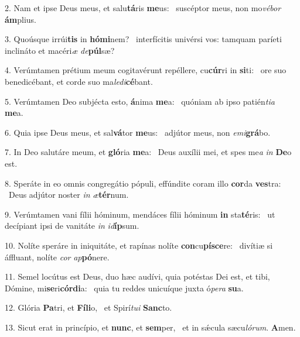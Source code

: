 2. Nam et ipse Deus meus, et salu\textbf{tá}ris \textbf{me}us: \ast\  suscéptor meus, non mo\textit{vé}\textit{bor} \textbf{ám}plius.\

3. Quoúsque irrúi\textbf{tis} in \textbf{hó}\textbf{mi}nem? \ast\  interfícitis univérsi vos: tamquam paríeti inclináto et macéri\textit{æ} \textit{de}\textbf{púl}sæ?\

4. Verúmtamen prétium meum cogitavérunt repéllere, cu\textbf{cúr}ri in \textbf{si}ti: \ast\  ore suo benedicébant, et corde suo ma\textit{le}\textit{di}\textbf{cé}bant.\

5. Verúmtamen Deo subjécta esto, \textbf{á}nima \textbf{me}a: \ast\  quóniam ab ipso patién\textit{ti}\textit{a} \textbf{me}a.\

6. Quia ipse Deus meus, et sal\textbf{vá}tor \textbf{me}us: \ast\  adjútor meus, non \textit{e}\textit{mi}\textbf{grá}bo.\

7. In Deo salutáre meum, et \textbf{gló}ria \textbf{me}a: \ast\  Deus auxílii mei, et spes me\textit{a} \textit{in} \textbf{De}o est.\

8. Speráte in eo omnis congregátio pópuli, effúndite coram illo \textbf{cor}da \textbf{ves}tra: \ast\  Deus adjútor noster \textit{in} \textit{æ}\textbf{tér}num.\

9. Verúmtamen vani fílii hóminum, mendáces fílii hóminum \textbf{in} sta\textbf{té}ris: \ast\  ut decípiant ipsi de vanitáte \textit{in} \textit{id}\textbf{íp}sum.\

10. Nolíte speráre in iniquitáte, et rapínas nolíte \textbf{con}cu\textbf{pí}\textbf{sce}re: \ast\  divítiæ si áffluant, nolíte \textit{cor} \textit{ap}\textbf{pó}nere.\

11. Semel locútus est Deus, duo hæc audívi, quia potéstas Dei est, et tibi, Dómine, mi\textbf{se}ri\textbf{cór}\textbf{di}a: \ast\  quia tu reddes unicuíque juxta ó\textit{pe}\textit{ra} \textbf{su}a.\

12. Glória \textbf{Pa}tri, et \textbf{Fí}\textbf{li}o, \ast\  et Spirí\textit{tu}\textit{i} \textbf{Sanc}to.\

13. Sicut erat in princípio, et \textbf{nunc}, et \textbf{sem}per, \ast\  et in sǽcula sæcu\textit{ló}\textit{rum}. \textbf{A}men.\

